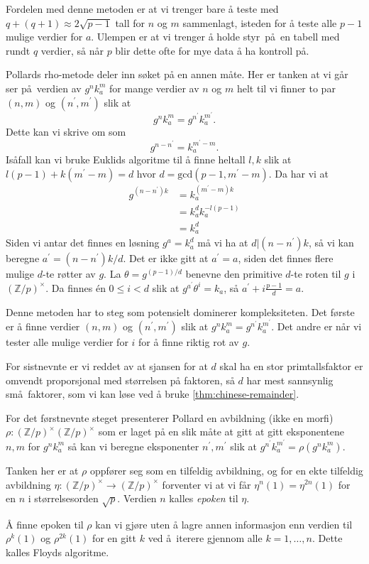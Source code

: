Fordelen med denne metoden er at vi trenger bare å teste med
$q + (q + 1) \approx 2\sqrt{p - 1}$ tall for $n$ og $m$ sammenlagt,
isteden for å teste alle $p - 1$ mulige verdier for $a$.
Ulempen er at vi trenger å holde styr på en tabell med rundt $q$
verdier, så når $p$ blir dette ofte for mye data å ha kontroll på.

Pollards rho-metode \cite{pollard_monte_1978} deler inn søket på en annen måte.
Her er tanken at vi går ser på verdien av $g^n k_a^m$ for mange verdier av $n$ og $m$
helt til vi finner to par $(n,m)$ og $(n^\prime, m^\prime)$ slik at
\[
    g^n k_a^m = g^{n^\prime} k_a^{m^\prime}.
\]
Dette kan vi skrive om som
\[
    g^{n - n^\prime} = k_a^{m^\prime - m}.
\]
Isåfall kan vi bruke Euklids algoritme til å finne heltall $l, k$
slik at $l (p - 1) + k (m^\prime - m) = d$ hvor $d = \mathrm{gcd}(p - 1, m^\prime - m)$.
Da har vi at
\[\begin{aligned}
    g^{(n - n^\prime)k}
    &= k_a^{(m^\prime - m)k}
    \\
    &= k_a^d k_a^{-l(p - 1)}
    \\
    &= k_a^d
\end{aligned}\]
Siden vi antar det finnes en løsning $g^a = k_a^d$ må vi ha at $d | (n - n^\prime) k$,
så vi kan beregne $a^\prime = (n - n^\prime) k / d$.
Det er ikke gitt at $a^\prime = a$,
siden det finnes flere mulige $d$-te røtter av $g$.
La $\theta = g^{(p - 1) / d}$ benevne den primitive $d$-te roten til $g$
i ${(\mathbb Z / p)}^\times$.
Da finnes \'en $0\leq i < d$ slik at
$g^{a^\prime} \theta^i = k_a$,
så $a^\prime + i\frac {p - 1} d = a$.

Denne metoden har to steg som potensielt dominerer kompleksiteten.
Det første er å finne verdier $(n, m)$ og $(n^\prime, m^\prime)$
slik at $g^n k_a^m = g^{n^\prime} k_a^{m^\prime}$.
Det andre er når vi tester alle mulige verdier for $i$
for å finne riktig rot av $g$.

For sistnevnte er vi reddet av at sjansen for at $d$ skal ha en stor
primtallsfaktor er omvendt proporsjonal med størrelsen på faktoren,
så $d$ har mest sannsynlig små faktorer,
som vi kan løse ved å bruke \cref{thm:chinese-remainder}.

For det førstnevnte steget presenterer Pollard en avbildning (ikke en morfi)
$\rho \colon {(\mathbb Z / p)}^\times {(\mathbb Z / p)}^\times$
som er laget på en slik måte at gitt at gitt eksponentene $n, m$
for $g^n k_a^m$ så kan vi beregne eksponenter $n^\prime, m^\prime$
slik at $g^{n^\prime} k_a^{m^\prime} = \rho(g^n k_a^m)$.

Tanken her er at $\rho$ oppfører seg som en tilfeldig avbildning,
og for en ekte tilfeldig avbildning
$\eta\colon {(\mathbb Z / p)}^\times\to {(\mathbb Z / p)}^\times$
forventer vi at vi får $\eta^n(1) = \eta^{2n}(1)$
for en $n$ i størrelsesorden $\sqrt p$.
Verdien $n$ kalles \textit{epoken} til $\eta$.

Å finne epoken til $\rho$ kan vi gjøre uten å lagre annen informasjon
enn verdien til $\rho^k(1)$ og $\rho^{2k}(1)$
for en gitt $k$ ved å iterere
gjennom alle $k = 1,\dots,n$.
Dette kalles Floyds algoritme.

